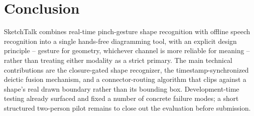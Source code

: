\documentclass[sigconf]{acmart}
\begin{document}
\section{Conclusion}
SketchTalk combines real-time pinch-gesture shape recognition with offline
speech recognition into a single hands-free diagramming tool, with an
explicit design principle -- gesture for geometry, whichever channel is
more reliable for meaning -- rather than treating either modality as a
strict primary. The main technical contributions are the closure-gated
shape recognizer, the timestamp-synchronized deictic fusion mechanism, and
a connector-routing algorithm that clips against a shape's real drawn
boundary rather than its bounding box. Development-time testing already
surfaced and fixed a number of concrete failure modes; a short structured
two-person pilot remains to close out the evaluation before submission.
\end{document}
